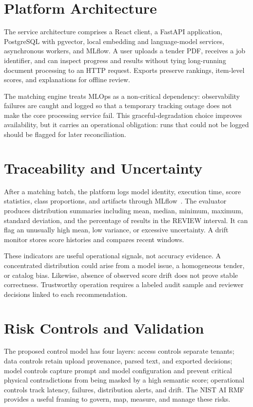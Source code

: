 \documentclass[conference]{IEEEtran}
\begin{document}
\section{Platform Architecture}
The service architecture comprises a React client, a FastAPI application, PostgreSQL with pgvector, local embedding and language-model services, asynchronous workers, and MLflow. A user uploads a tender PDF, receives a job identifier, and can inspect progress and results without tying long-running document processing to an HTTP request. Exports preserve rankings, item-level scores, and explanations for offline review.

The matching engine treats MLOps as a non-critical dependency: observability failures are caught and logged so that a temporary tracking outage does not make the core processing service fail. This graceful-degradation choice improves availability, but it carries an operational obligation: runs that could not be logged should be flagged for later reconciliation.

\section{Traceability and Uncertainty}
After a matching batch, the platform logs model identity, execution time, score statistics, class proportions, and artifacts through MLflow~\cite{zaharia2018mlflow}. The evaluator produces distribution summaries including mean, median, minimum, maximum, standard deviation, and the percentage of results in the REVIEW interval. It can flag an unusually high mean, low variance, or excessive uncertainty. A drift monitor stores score histories and compares recent windows.

These indicators are useful operational signals, not accuracy evidence. A concentrated distribution could arise from a model issue, a homogeneous tender, or catalog bias. Likewise, absence of observed score drift does not prove stable correctness. Trustworthy operation requires a labeled audit sample and reviewer decisions linked to each recommendation.

\section{Risk Controls and Validation}
The proposed control model has four layers: access controls separate tenants; data controls retain upload provenance, parsed text, and exported decisions; model controls capture prompt and model configuration and prevent critical physical contradictions from being masked by a high semantic score; operational controls track latency, failures, distribution alerts, and drift. The NIST AI RMF~\cite{nist2023airmf} provides a useful framing to govern, map, measure, and manage these risks.
\end{document}
